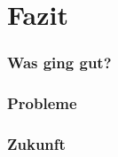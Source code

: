 \section{Fazit}
\begin{frame}
\frametitle{Was ging gut?}
\end{frame}



\begin{frame}
\frametitle{Probleme}
\end{frame}


\begin{frame}
\frametitle{Zukunft}
\end{frame}